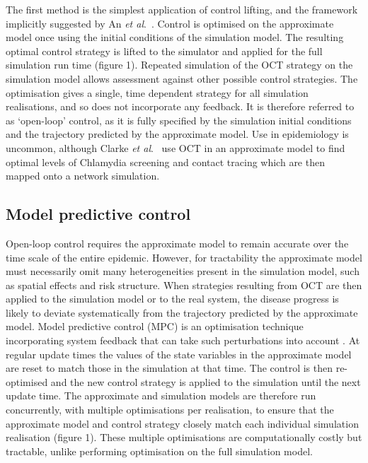 The first method is the simplest application of control lifting, and the framework implicitly suggested by An \textit{et al}.\ \citep{an_optimization_2017}. Control is optimised on the approximate model once using the initial conditions of the simulation model. The resulting optimal control strategy is lifted to the simulator and applied for the full simulation run time (figure 1). Repeated simulation of the OCT strategy on the simulation model allows assessment against other possible control strategies. The optimisation gives a single, time dependent strategy for all simulation realisations, and so does not incorporate any feedback. It is therefore referred to as `open-loop' control, as it is fully specified by the simulation initial conditions and the trajectory predicted by the approximate model. Use in epidemiology is uncommon, although Clarke \textit{et al}.\ \citep{clarke_approximating_2013} use OCT in an approximate model to find optimal levels of Chlamydia screening and contact tracing which are then mapped onto a network simulation.

\subsection*{Model predictive control}

Open-loop control requires the approximate model to remain accurate over the time scale of the entire epidemic. However, for tractability the approximate model must necessarily omit many heterogeneities present in the simulation model, such as spatial effects and risk structure. When strategies resulting from OCT are then applied to the simulation model or to the real system, the disease progress is likely to deviate systematically from the trajectory predicted by the approximate model. Model predictive control (MPC) is an optimisation technique incorporating system feedback that can take such perturbations into account \citep{camacho_model_2012, lee_model_2011}. At regular update times the values of the state variables in the approximate model are reset to match those in the simulation at that time. The control is then re-optimised and the new control strategy is applied to the simulation until the next update time. The approximate and simulation models are therefore run concurrently, with multiple optimisations per realisation, to ensure that the approximate model and control strategy closely match each individual simulation realisation (figure 1). These multiple optimisations are computationally costly but tractable, unlike performing optimisation on the full simulation model.

